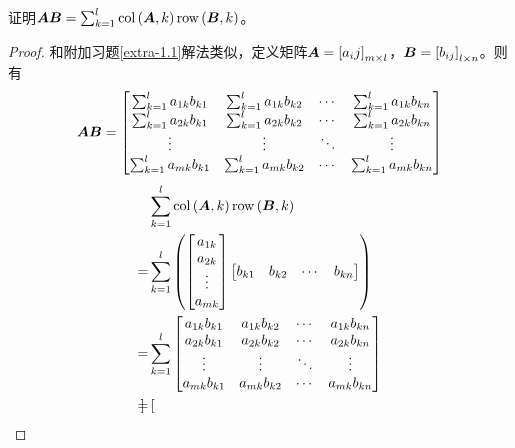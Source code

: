 \begin{extraprob}\label{extra-1.2}
    证明\(\boldsymbol{A}\boldsymbol{B}=\sum_{k=1}^l\mathrm{col}\left( \boldsymbol{A},k \right)\mathrm{row}\left( \boldsymbol{B},k \right)\)。
\end{extraprob}
\begin{proof}
    和附加习题\ref{extra-1.1}解法类似，定义矩阵\(\boldsymbol{A}=\left[ a_ij \right]_{m\times l}\)，\(\boldsymbol{B}=\left[ b_{ij} \right]_{l\times n}\)。则有
    \begin{equation*}
        \boldsymbol{A}\boldsymbol{B}=
        \begin{bmatrix}
            \sum_{k=1}^la_{1k}b_{k1} & \sum_{k=1}^la_{1k}b_{k2} & \cdots & \sum_{k=1}^la_{1k}b_{kn} \\
            \sum_{k=1}^la_{2k}b_{k1} & \sum_{k=1}^la_{2k}b_{k2} & \cdots & \sum_{k=1}^la_{2k}b_{kn} \\
            \vdots                   & \vdots                   & \ddots & \vdots                   \\
            \sum_{k=1}^la_{mk}b_{k1} & \sum_{k=1}^la_{mk}b_{k2} & \cdots & \sum_{k=1}^la_{mk}b_{kn}
        \end{bmatrix}
    \end{equation*}
    \begin{align*}
          & \sum_{k=1}^l\mathrm{col}\left( \boldsymbol{A},k \right)\mathrm{row}\left( \boldsymbol{B},k \right)        \\ =&\sum_{k=1}^l
        \left( 
            \begin{bmatrix}
                a_{1k} \\a_{2k}\\\vdots\\a_{mk}
            \end{bmatrix}
            \begin{bmatrix}
                b_{k1} & b_{k2} & \cdots & b_{kn}
            \end{bmatrix}
         \right)                                                   \\
        = & \sum_{k=1}^l
        \begin{bmatrix}
            a_{1k}b_{k1} & a_{1k}b_{k2} & \cdots & a_{1k}b_{kn} \\
            a_{2k}b_{k1} & a_{2k}b_{k2} & \cdots & a_{2k}b_{kn} \\
            \vdots       & \vdots       & \ddots & \vdots       \\
            a_{mk}b_{k1} & a_{mk}b_{k2} & \cdots & a_{mk}b_{kn}
        \end{bmatrix} \\
        = &
        \begin{bmatrix}

\end{bmatrix}
\end{align*}
\end{proof}
